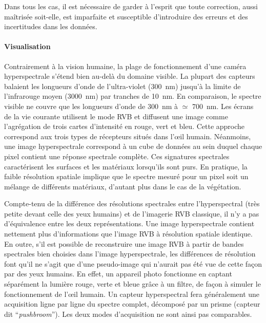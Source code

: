Dans tous les cas, il est nécessaire de garder à l'esprit que toute correction, aussi maîtrisée soit-elle, est imparfaite et susceptible d'introduire des erreurs et des incertitudes dans les données.

\paragraph{Visualisation}
Contrairement à la vision humaine, la plage de fonctionnement d'une caméra hyperspectrale s'étend bien au-delà du domaine visible. La plupart des capteurs balaient les longueurs d'onde de l'ultra-violet (\SI{300}{\nano\meter}) jusqu'à la limite de l'infrarouge moyen (\SI{3 000}{\nano\meter}) par tranches de \SI{10}{\nano\meter}. En comparaison, le spectre visible ne couvre que les longueurs d'onde de \SI{300}{\nano\meter} à $\simeq$ \SI{700}{\nano\meter}. Les écrans de la vie courante utilisent le mode \gls{RVB} et diffusent une image comme l'agrégation de trois cartes d'intensité en rouge, vert et bleu. Cette approche correspond aux trois types de récepteurs situés dans l'\oe{}il humain. Néanmoins, une image hyperspectrale correspond à un cube de données au sein duquel chaque pixel contient une réponse spectrale complète. Ces signatures spectrales caractérisent les surfaces et les matériaux lorsqu'ils sont purs. En pratique, la faible résolution spatiale implique que le spectre mesuré pour un pixel soit un mélange de différents matériaux, d'autant plus dans le cas de la végétation.

Compte-tenu de la différence des résolutions spectrales entre l'hyperspectral (très petite devant celle des yeux humains) et de l'imagerie \gls{RVB} classique, il n'y a pas d'équivalence entre les deux représentations. Une image hyperspectrale contient nettement plus d'informations que l'image \gls{RVB} à résolution spatiale identique. En outre, s'il est possible de reconstruire une image \gls{RVB} à partir de bandes spectrales bien choisies dans l'image hyperspectrale, les différences de résolution font qu'il ne s'agit que d'une pseudo-image qui n'aurait pas été vue de cette façon par des yeux humains. En effet, un appareil photo fonctionne en captant séparément la lumière rouge, verte et bleue grâce à un filtre, de façon à simuler le fonctionnement de l'\oe{}il humain. Un capteur hyperspectral fera généralement une acquisition ligne par ligne du spectre complet, décomposé par un prisme (capteur dit ``\textit{pushbroom}''). Les deux modes d'acquisition ne sont ainsi pas comparables.

